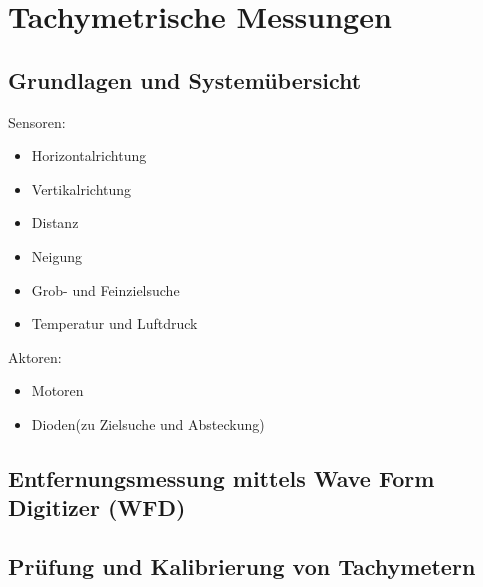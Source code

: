 \documentclass[12pt]{article}
\begin{document}
	\pagestyle{main}
\tableofcontents
\newpage
\section{Tachymetrische Messungen}	
\subsection{Grundlagen und Systemübersicht}
Sensoren:
\begin{itemize}
	\item Horizontalrichtung
	\item Vertikalrichtung
	\item Distanz
	\item Neigung
	\item Grob- und Feinzielsuche
	\item Temperatur und Luftdruck
\end{itemize}
Aktoren:
\begin{itemize}
	\item Motoren
	\item Dioden(zu Zielsuche und Absteckung)
\end{itemize}
\subsection{Entfernungsmessung mittels Wave Form Digitizer (WFD)}
\subsection{Prüfung und Kalibrierung von Tachymetern}
\end{document}
